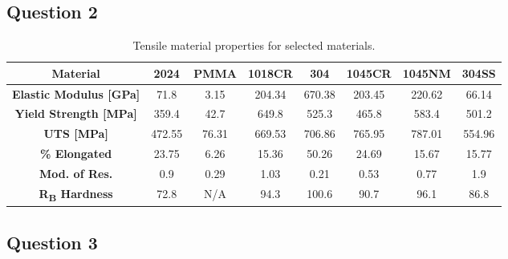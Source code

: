 \documentclass{article}
\begin{document}
\subsection{Question 2}

\begin{table}[!h!]
    \centering
    \def\arraystretch{1.5}
    \caption{Tensile material properties for selected materials.}
    \begin{tabular}{|c|c|c|c|c|c|c|c|}
         \toprule
         \hline
         \textbf{Material}& \textbf{2024} & \textbf{PMMA} & \textbf{1018CR} & \textbf{304} & \textbf{1045CR} &\textbf{1045NM} & \textbf{304SS}\\
         \midrule
         \hline
         \textbf{Elastic Modulus [GPa]}& 71.8 & 3.15 & 204.34 & 670.38 & 203.45 & 220.62 & 66.14 \\
         \textbf{Yield Strength [MPa]} & 359.4 & 42.7 & 649.8 & 525.3 & 465.8 & 583.4 & 501.2 \\
         \textbf{UTS [MPa]} & 472.55 & 76.31 & 669.53 & 706.86 & 765.95 & 787.01 & 554.96 \\
         \textbf{\% Elongated} & 23.75 & 6.26 & 15.36 & 50.26 & 24.69 & 15.67 & 15.77 \\
         \textbf{Mod. of Res.} & 0.9 & 0.29 & 1.03 & 0.21 & 0.53 & 0.77 & 1.9\\
         \textbf{R\textsubscript{B} Hardness} & 72.8 & N/A & 94.3 & 100.6 & 90.7 & 96.1 & 86.8 \\
         \hline
    \end{tabular}
    \label{tab:q2}
\end{table}


\newpage
\subsection{Question 3}
\end{document}
